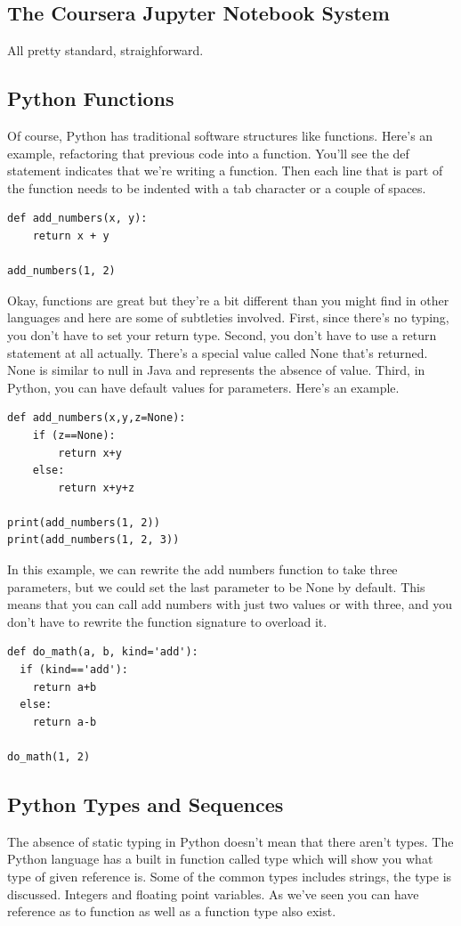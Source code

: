 \documentclass[11pt]{article}
\begin{document}
\subsection{The Coursera Jupyter Notebook System}
All pretty standard, straighforward. 


\subsection{Python Functions}
Of course, Python has traditional software structures like
functions. Here's an example, refactoring that previous code into a
function. You'll see the def statement indicates that we're writing a
function. Then each line that is part of the function needs to be
indented with a tab character or a couple of spaces.

\begin{lstlisting}
def add_numbers(x, y):
    return x + y

add_numbers(1, 2)
\end{lstlisting}

Okay, functions are great but they're a bit different than you might
find in other languages and here are some of subtleties
involved. First, since there's no typing, you don't have to set your
return type. Second, you don't have to use a return statement at all
actually. There's a special value called None that's returned. None is
similar to null in Java and represents the absence of value.  Third,
in Python, you can have default values for parameters.
Here's an example.
\begin{lstlisting}
def add_numbers(x,y,z=None):
    if (z==None):
        return x+y
    else:
        return x+y+z

print(add_numbers(1, 2))
print(add_numbers(1, 2, 3))
\end{lstlisting}
 In this example, we can rewrite the add numbers function to take
three parameters, but we could set the last parameter to be None by
default. This means that you can call add numbers with just two values
or with three, and you don't have to rewrite the function signature to
overload it.

\begin{lstlisting}
def do_math(a, b, kind='add'):
  if (kind=='add'):
    return a+b
  else:
    return a-b

do_math(1, 2)
\end{lstlisting}


    \subsection{Python Types and Sequences}
    The absence of static typing in Python doesn't mean that there
    aren't types. The Python language has a built in function called type
    which will show you what type of given reference is. Some of the
    common types includes strings, the type is discussed. Integers and
    floating point variables. As we've seen you can have reference as to
    function as well as a function type also exist.
    
\end{document}

